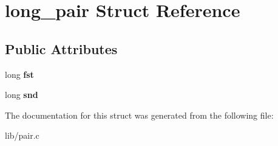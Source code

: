 \hypertarget{structlong__pair}{}\section{long\+\_\+pair Struct Reference}
\label{structlong__pair}
\subsection*{Public Attributes}
\begin{DoxyCompactItemize}
\item 
long {\bfseries fst}\hypertarget{structlong__pair_a7cfd71dae8a1bff732fbf8a372129327}{}\label{structlong__pair_a7cfd71dae8a1bff732fbf8a372129327}

\item 
long {\bfseries snd}\hypertarget{structlong__pair_ac6845698d9c04e20c768f12181598503}{}\label{structlong__pair_ac6845698d9c04e20c768f12181598503}

\end{DoxyCompactItemize}


The documentation for this struct was generated from the following file\+:\begin{DoxyCompactItemize}
\item 
lib/pair.\+c\end{DoxyCompactItemize}
